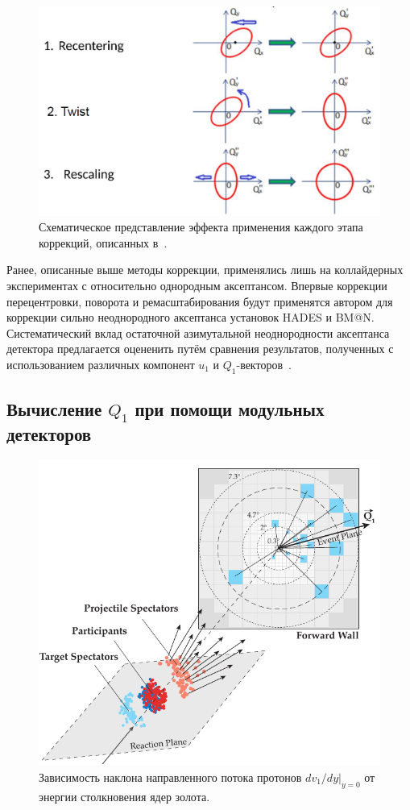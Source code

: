 \begin{figure}[h]
    \centering
    \includegraphics[width=0.5\linewidth]{images/corrections_for_nonuniformity.png}
    \caption{Схематическое представление эффекта применения каждого этапа коррекций, описанных в~\cite{Selyuzhenkov:2007zi}.}
    \label{fig:qn_corrections}
\end{figure}
Ранее, описанные выше методы коррекции, применялись лишь на коллайдерных экспериментах с относительно однородным аксептансом. 
Впервые коррекции перецентровки, поворота и ремасштабирования будут применятся автором для коррекции сильно неоднородного аксептанса установок HADES и BM@N.
Систематический вклад остаточной азимутальной неоднородности аксептанса детектора предлагается оцененить путём сравнения результатов, полученных с использованием различных компонент $u_1$ и $Q_1$-векторов~\cite{Mamaev:2020qom,Mamaev:2023yhz}. 

\subsection{Вычисление $Q_1$ при помощи модульных детекторов}

\begin{figure}
    \centering
    \includegraphics[width=0.5\linewidth]{images/plane.png}
    \caption{Зависимость наклона направленного потока протонов $dv_1/dy|_{y=0}$ от энергии столкновения ядер золота.}
    \label{fig:plane}
\end{figure}


